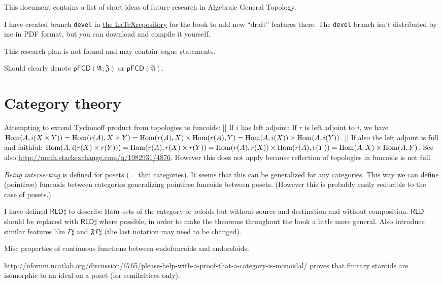 \documentclass{amsart}
\begin{document}
This document contains a list of short ideas of future research in Algebraic
General Topology.

I have created branch \texttt{devel} in \href{https://bitbucket.org/portonv/algebraic-general-topology}{the \LaTeX repository} for the book
to add new ``draft'' features there. The \texttt{devel} branch isn't distributed by me in PDF format, but you can download and compile it yourself.

This research plan is not formal and may contain vague statements.

Should clearly denote $\mathsf{pFCD}(\mathfrak{A};\mathfrak{Z})$ or $\mathsf{pFCD}(\mathfrak{A})$.

\section{Category theory}

Attempting to extend Tychonoff product from topologies to funcoids:
|| If $i$ has left adjoint:
If $r$ is left adjoint to $i$, we have $\operatorname{Hom}(A, i(X\times Y)) = \operatorname{Hom}(r(A), X\times Y) = \operatorname{Hom}(r(A), X)\times \operatorname{Hom}(r(A), Y) = \operatorname{Hom}(A, i(X))\times \operatorname{Hom}(A, i(Y))$.
|| If also the left adjoint is full and faithful:
$\operatorname{Hom}(A, i(r(X)\times r(Y))) = \operatorname{Hom}(r(A), r(X)\times r(Y)) = \operatorname{Hom}(r(A), r(X))\times \operatorname{Hom}(r(A), r(Y)) = \operatorname{Hom}(A, X)\times \operatorname{Hom}(A, Y)$.
See also \url{http://math.stackexchange.com/q/1982931/4876}. However this does not apply because reflection of topologies in funcoids
is not full.

\emph{Being intersecting} is defined for posets (=~thin categories). It seems that this can be generalized for any categories.
This way we can define (pointfree) funcoids between categories generalizing pointfree funcoids between posets.
(However this is probably easily reducible to the case of posets.)

I have defined $\mathsf{RLD}\sharp$ to describe $\operatorname{Hom}$-sets of the category or reloids but without source and destination and without composition.
$\mathsf{RLD}$ should be replaced with $\mathsf{RLD}\sharp$ where possible, in order to make the theorems throughout the book a little more general.
Also introduce similar features like $\Gamma\sharp$ and $\mathfrak{F}\Gamma\sharp$ (the last notation may need to be changed).

Misc properties of continuous functions between endofuncoids and endoreloids.

\url{http://nforum.ncatlab.org/discussion/6765/please-help-with-a-proof-that-a-category-is-monoidal/} proves that
finitary staroids are isomorphic to an ideal on a poset (for semilattices only).
\end{document}
